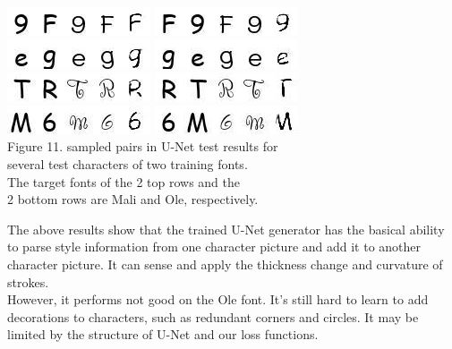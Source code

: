 \documentclass[letterpaper]{article}
\begin{document}
\begin{center}
    \includegraphics[width=.2\textwidth]{./report-figs/2.mali.1.jpg}
    \includegraphics[width=.2\textwidth]{./report-figs/2.mali.2.jpg}\\
    \includegraphics[width=.2\textwidth]{./report-figs/2.mali.3.jpg}
    \includegraphics[width=.2\textwidth]{./report-figs/2.mali.4.jpg}\\
    \includegraphics[width=.2\textwidth]{./report-figs/2.ole.1.jpg}
    \includegraphics[width=.2\textwidth]{./report-figs/2.ole.2.jpg}\\
    \includegraphics[width=.2\textwidth]{./report-figs/2.ole.3.jpg}
    \includegraphics[width=.2\textwidth]{./report-figs/2.ole.4.jpg}\\

    Figure 11. sampled pairs in U-Net test results for\\several test characters of two training fonts.\\The target fonts of the 2 top rows and the\\2 bottom rows are Mali and Ole, respectively.
\end{center}

The above results show that the trained U-Net generator has the basical ability to parse style information from one character picture and add it to another character picture. It can sense and apply the thickness change and curvature of strokes.
\\
However, it performs not good on the Ole font. It's still hard to learn to add decorations to characters, such as redundant corners and circles. It may be limited by the structure of U-Net and our loss functions.
\end{document}
